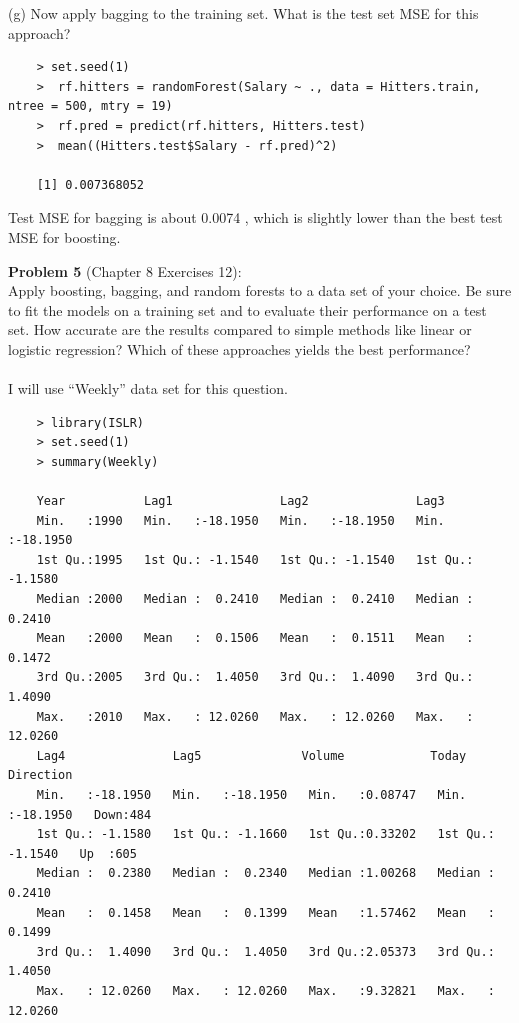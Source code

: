 \documentclass{article}
\begin{document}
(g) Now apply bagging to the training set. What is the test set MSE for this approach? \\

\begin{program}
	\begin{verbatim}
	> set.seed(1)
	>  rf.hitters = randomForest(Salary ~ ., data = Hitters.train, ntree = 500, mtry = 19)
	>  rf.pred = predict(rf.hitters, Hitters.test)
	>  mean((Hitters.test$Salary - rf.pred)^2)
	
	[1] 0.007368052
	\end{verbatim}
\end{program}

Test MSE for bagging is about 0.0074 , which is slightly lower than the best test MSE for boosting.


\newpage
{\bf Problem 5} (Chapter 8 Exercises 12):\\
Apply boosting, bagging, and random forests to a data set of your choice. Be sure to fit the models on a training set and to evaluate their performance on a test set. How accurate are the results compared to simple methods like linear or logistic regression? Which of these approaches yields the best performance? \\
\\

I will use “Weekly” data set for this question.

\begin{program}
	\begin{verbatim}
	> library(ISLR)
	> set.seed(1)
	> summary(Weekly)
	
	Year           Lag1               Lag2               Lag3         
	Min.   :1990   Min.   :-18.1950   Min.   :-18.1950   Min.   :-18.1950  
	1st Qu.:1995   1st Qu.: -1.1540   1st Qu.: -1.1540   1st Qu.: -1.1580  
	Median :2000   Median :  0.2410   Median :  0.2410   Median :  0.2410  
	Mean   :2000   Mean   :  0.1506   Mean   :  0.1511   Mean   :  0.1472  
	3rd Qu.:2005   3rd Qu.:  1.4050   3rd Qu.:  1.4090   3rd Qu.:  1.4090  
	Max.   :2010   Max.   : 12.0260   Max.   : 12.0260   Max.   : 12.0260  
	Lag4               Lag5              Volume            Today          Direction 
	Min.   :-18.1950   Min.   :-18.1950   Min.   :0.08747   Min.   :-18.1950   Down:484  
	1st Qu.: -1.1580   1st Qu.: -1.1660   1st Qu.:0.33202   1st Qu.: -1.1540   Up  :605  
	Median :  0.2380   Median :  0.2340   Median :1.00268   Median :  0.2410             
	Mean   :  0.1458   Mean   :  0.1399   Mean   :1.57462   Mean   :  0.1499             
	3rd Qu.:  1.4090   3rd Qu.:  1.4050   3rd Qu.:2.05373   3rd Qu.:  1.4050             
	Max.   : 12.0260   Max.   : 12.0260   Max.   :9.32821   Max.   : 12.0260             
	\end{verbatim}
\end{program}
\end{document}
